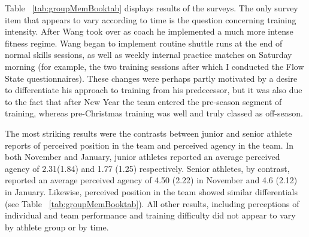 \begin{CJK}{UTF8}{gbsn}
Table ~\ref{tab:groupMemBooktab} displays results of the surveys.  The only survey item that appears to vary according to time is the question concerning training intensity.  After Wang took over as coach he implemented a much more intense fitness regime.  Wang began to implement routine shuttle runs at the end of normal skills sessions, as well as weekly internal practice matches on Saturday morning (for example, the two training sessions after which I conducted the Flow State questionnaires).  These changes were perhaps partly motivated by a desire to differentiate his approach to training from his predecessor, but it was also due to the fact that after New Year the team entered the pre-season segment of training, whereas pre-Christmas training was well and truly classed as off-season.

The most striking results were the contrasts between junior and senior athlete reports of perceived position in the team and perceived agency in the team.  In both November and January, junior athletes reported an average perceived agency of 2.31(1.84) and 1.77 (1.25) respectively. Senior athletes, by contrast, reported an average perceived agency of 4.50 (2.22) in November and 4.6 (2.12) in January.  Likewise, perceived position in the team showed similar differentials (see Table ~\ref{tab:groupMemBooktab}).  All other results, including perceptions of individual and team performance and training difficulty did not appear to vary by athlete group or by time.



\end{CJK}
